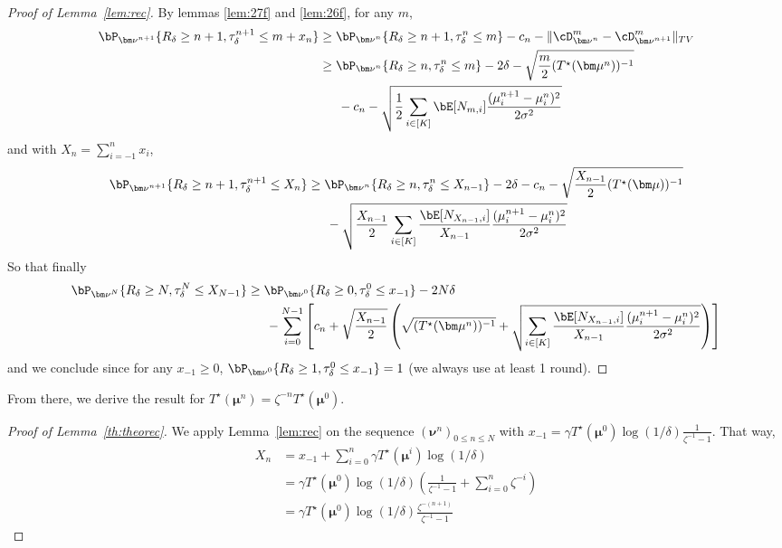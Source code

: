 \begin{proof}[Proof of Lemma~\ref{lem:rec}] 
	By lemmas \ref{lem:27f} and \ref{lem:26f}, for any $m$, \begin{align*} 
		\bP_{{\bm\nu}^{n+1}}\{R_\delta\geq n+1,\tau_\delta^{n+1}\leq m+x_n\}  &\geq \bP_{{\bm\nu}^n}\{R_\delta\geq n+1,\tau_\delta^n\leq m\}-c_n-\Vert\cD_{{\bm\nu}^n}^m-\cD_{{\bm\nu}^{n+1}}^m\Vert_{TV}\\
		&\geq \bP_{{\bm\nu}^{n}}\{R_\delta \geq n,\tau_\delta^n\leq m\}-2\delta-\sqrt{\frac{m}{2} (T^\star(\bm\mu^n))^{-1}}\\
		&\hspace{1.5em}-c_n-\sqrt{\frac{1}{2}\sum_{i\in[K]}\bE[N_{m,i}] \frac{(\mu_i^{n+1}-\mu_i^n)^2}{2\sigma^2}}
	\end{align*} and with $X_n=\sum_{i=-1}^{n} x_i$, \begin{align*}\bP_{{\bm\nu}^{n+1}}\{R_\delta\geq n+1,\tau_\delta^{n+1}\leq X_n\} & \geq \bP_{{\bm\nu}^{n}}\{R_\delta\geq n,\tau_\delta^n\leq X_{n-1}\}-2\delta-c_n -\sqrt{\frac{X_{n-1}}{2} (T^\star(\bm\mu))^{-1}}\\
	&\hspace{1.5em} -\sqrt{\frac{X_{n-1}}{2}\sum_{i\in[K]}\frac{\bE[N_{X_{n-1},i}]}{X_{n-1}} \frac{(\mu_i^{n+1}-\mu_i^n)^2}{2\sigma^2}}\end{align*} So that finally \begin{align*}
	\bP_{{\bm\nu}^{N}}\{R_\delta\geq N,\tau_\delta^N\leq X_{N-1}\} &\geq \bP_{{\bm\nu}^{0}}\{R_\delta\geq 0,\tau_\delta^0\leq x_{-1}\}-2N\delta\\
	&\hspace{1.5em} -\sum_{i=0}^{N-1}\left[ c_n+ \sqrt{\frac{X_{n-1}}{2}}\left(\sqrt{ (T^\star(\bm\mu^n))^{-1} } +\sqrt{\sum_{i\in[K]}\frac{\bE[N_{X_{n-1},i}]}{X_{n-1}} \frac{(\mu_i^{n+1}-\mu_i^n)^2}{2\sigma^2}}\right)\right]\end{align*} and we conclude since for any $x_{-1}\geq 0$, $\bP_{{\bm\nu}^0}\{R_\delta\geq 1,\tau_\delta^0\leq x_{-1}\}=1$ (we always use at least 1 round).
\end{proof}

From there, we derive the result for $T^\star(\bm\mu^n)=\zeta^{-n} T^\star(\bm\mu^0)$.

\theorec* 


\begin{proof}[Proof of Lemma~\ref{th:theorec}]
	We apply Lemma~\ref{lem:rec} on the sequence $(\bm\nu^n)_{0\leq n\leq N}$ with $x_{-1}=\gamma T^\star(\bm\mu^0)\log(1/\delta)\frac{1}{\zeta^{-1}-1}$. That way, \begin{align*} X_{n} &= x_{-1} +\sum_{i=0}^n \gamma T^\star(\bm\mu^i)\log(1/\delta)\\
		&=\gamma T^\star(\bm\mu^0)\log(1/\delta)\left( \frac{1}{\zeta^{-1}-1}+\sum_{i=0}^n \zeta^{-i}\right)\\
		&=\gamma T^\star(\bm\mu^0)\log(1/\delta)\frac{\zeta^{-(n+1)}}{\zeta^{-1}-1}
	\end{align*}
	
\end{proof}

